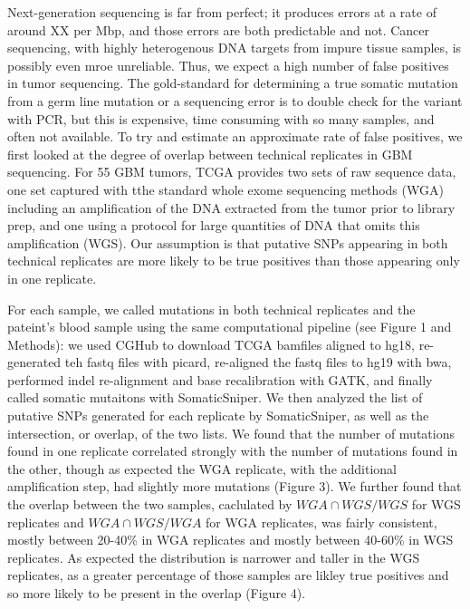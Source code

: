 \documentclass[11pt]{article} %
\begin{document}
Next-generation sequencing is far from perfect; it produces errors at a rate of around XX per Mbp, and those errors are both predictable and not. Cancer sequencing, with highly heterogenous DNA targets from impure tissue samples, is possibly even mroe unreliable. Thus, we expect a high number of false positives in tumor sequencing. The gold-standard for determining a true somatic mutation from a germ line mutation or a sequencing error is to double check for the variant with PCR, but this is expensive, time consuming with so many samples, and often not available. To try and estimate an approximate rate of false positives, we first looked at the degree of overlap between technical replicates in GBM sequencing. For 55 GBM tumors, TCGA provides two sets of raw sequence data, one set captured with tthe standard whole exome sequencing methods (WGA) including an amplification of the DNA extracted from the tumor prior to library prep, and one using a protocol for large quantities of DNA that omits this amplification (WGS). Our assumption is that putative SNPs appearing in both technical replicates are more likely to be true positives than those appearing only in one replicate.

For each sample, we called mutations in both technical replicates and the pateint's blood sample using the same computational pipeline (see Figure 1 and Methods): we used CGHub to download TCGA bamfiles aligned to hg18, re-generated teh fastq files with picard, re-aligned the fastq files to hg19 with bwa, performed indel re-alignment and base recalibration with GATK, and finally called somatic mutaitons with SomaticSniper. We then analyzed the list of putative SNPs generated for each replicate by SomaticSniper, as well as the intersection, or overlap, of the two lists. We found that the number of mutations found in one replicate correlated strongly with the number of mutations found in the other, though as expected the WGA replicate, with the additional amplification step, had slightly more mutations (Figure 3). We further found that the overlap between the two samples, caclulated by $WGA \cap WGS/WGS$ for WGS replicates and $WGA \cap WGS/WGA$ for WGA replicates, was fairly consistent, mostly between 20-40\% in WGA replicates and mostly between 40-60\% in WGS replicates. As expected the distribution is narrower and taller in the WGS replicates, as a greater percentage of those samples are likley true positives and so more likely to be present in the overlap (Figure 4).
\end{document}
